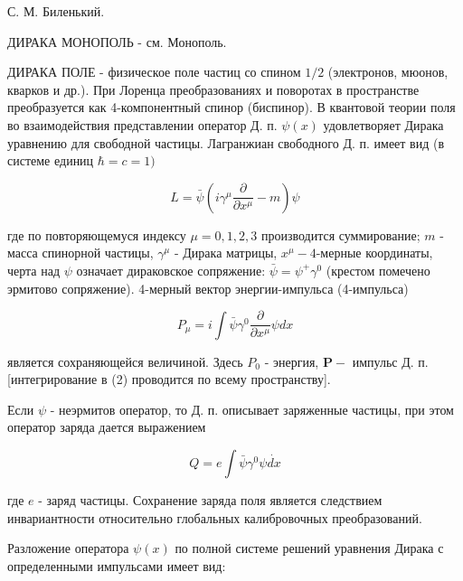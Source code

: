 \documentclass[10pt]{article}
\begin{document}
С. М. Биленький.



ДИРАКА МОНОПОЛЬ - см. Монополь.



ДИРАКА ПОЛЕ - физическое поле частиц со спином $1 / 2$ (электронов, мюонов, кварков и др.). При Лоренца преобразованиях и поворотах в пространстве преобразуется как 4-компонентный спинор (биспинор). В квантовой теории поля во взаимодействия представлении оператор Д. п. $\psi(x)$ удовлетворяет Дирака уравнению для свободной частицы. Лагранжиан свободного Д. п. имеет вид (в системе единиц $\hbar=c=1)$



\[

L=\bar{\psi}\left(i \gamma^{\mu} \frac{\partial}{\partial x^{\mu}}-m\right) \psi

\]



где по повторяющемуся индексу $\mu=0,1,2,3$ производится суммирование; $m$ - масса спинорной частицы, $\gamma^{\mu}$ - Дирака матрицы, $x^{\mu}-4$-мерные координаты, черта над $\psi$ означает дираковское сопряжение: $\bar{\psi}=\psi^{+} \gamma^{0}$ (крестом помечено эрмитово сопряжение). 4-мерный вектор энергии-импульса (4-импульса)



\[

P_{\mu}=i \int \bar{\psi} \gamma^{0} \frac{\partial}{\partial x^{\mu}} \psi d x

\]



является сохраняющейся величиной. Здесь $P_{0}$ - энергия, $\boldsymbol{P}-$ импульс Д. п. [интегрирование в (2) проводится по всему пространству].



Если $\psi$ - неэрмитов оператор, то Д. п. описывает заряженные частицы, при этом оператор заряда дается выражением



\[

Q=e \int \bar{\psi} \gamma^{0} \psi \dot{d x}

\]



где $e$ - заряд частицы. Сохранение заряда поля является следствием инвариантности относительно глобальных калибровочных преобразований.



Разложение оператора $\psi(x)$ по полной системе решений уравнения Дирака с определенными импульсами имеет вид:
\end{document}
